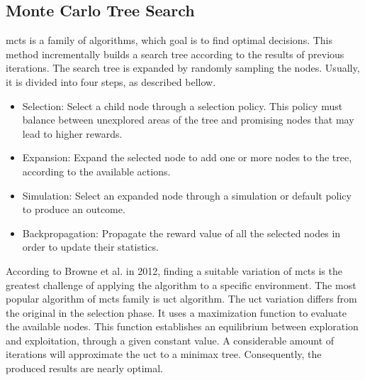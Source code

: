 \subsection{Monte Carlo Tree Search}


\gls{mcts} is a family of algorithms, which goal is to find optimal decisions.
This method incrementally builds a search tree according to the results of previous iterations.
The search tree is expanded by randomly sampling the nodes.
Usually, it is divided into four steps, as described bellow.
\begin{itemize}
  \item Selection: Select a child node through a selection policy. This policy must balance between unexplored areas of the tree and promising nodes that may lead to higher rewards.
  \item Expansion: Expand the selected node to add one or more nodes to the tree, according to the available actions.
  \item Simulation: Select an expanded node through a simulation or default policy to produce an outcome.
  \item Backpropagation: Propagate the reward value of all the selected nodes in order to update their statistics.
\end{itemize}

According to Browne et al. in 2012, finding a suitable variation of \gls{mcts} is the greatest challenge of applying the algorithm to a specific environment.
The most popular algorithm of \gls{mcts} family is \gls{uct} algorithm.
The \gls{uct} variation differs from the original in the selection phase.
It uses a maximization function to evaluate the available nodes.
This function establishes an equilibrium between exploration and exploitation, through a given constant value.
A considerable amount of iterations will approximate the \gls{uct} to a minimax tree.
Consequently, the produced results are nearly optimal.

